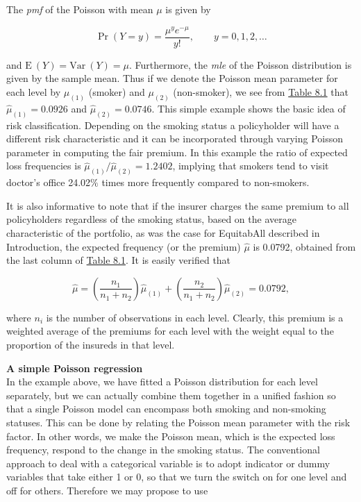 \documentclass[]{book}
\theoremstyle{definition}
\theoremstyle{definition}
\theoremstyle{definition}
\theoremstyle{remark}
\begin{document}
The \emph{pmf} of the Poisson with mean \(\mu\) is given by

\begin{equation}
\Pr(Y=y)=\frac{\mu^y e^{-\mu}}{y!},\qquad y=0,1,2, \ldots
\label{eq:Pois-pmf}
\end{equation}

and \(\mathrm{E~}{(Y)}=\mathrm{Var~}{(Y)}=\mu\). Furthermore, the
\emph{mle} of the Poisson distribution is given by the sample mean. Thus
if we denote the Poisson mean parameter for each level by \(\mu_{(1)}\)
(smoker) and \(\mu_{(2)}\) (non-smoker), we see from
\protect\hyperlink{tab:8.1}{Table 8.1} that \(\hat{\mu}_{(1)}=0.0926\)
and \(\hat{\mu}_{(2)}=0.0746\). This simple example shows the basic idea
of risk classification. Depending on the smoking status a policyholder
will have a different risk characteristic and it can be incorporated
through varying Poisson parameter in computing the fair premium. In this
example the ratio of expected loss frequencies is
\(\hat{\mu}_{(1)}/\hat{\mu}_{(2)}=1.2402\), implying that smokers tend
to visit doctor's office 24.02\(\%\) times more frequently compared to
non-smokers.

It is also informative to note that if the insurer charges the same
premium to all policyholders regardless of the smoking status, based on
the average characteristic of the portfolio, as was the case for
EquitabAll described in Introduction, the expected frequency (or the
premium) \(\hat{\mu}\) is 0.0792, obtained from the last column of
\protect\hyperlink{tab:8.1}{Table 8.1}. It is easily verified that

\begin{equation}
\hat{\mu} = \left(\frac{n_1}{n_1+n_2}\right)\hat{\mu}_{(1)}+\left(\frac{n_2}{n_1+n_2}\right)\hat{\mu}_{(2)}=0.0792,
\label{eq:coll-prem-avg}
\end{equation}

where \(n_i\) is the number of observations in each level. Clearly, this
premium is a weighted average of the premiums for each level with the
weight equal to the proportion of the insureds in that level.

\textbf{A simple Poisson regression}\\
In the example above, we have fitted a Poisson distribution for each
level separately, but we can actually combine them together in a unified
fashion so that a single Poisson model can encompass both smoking and
non-smoking statuses. This can be done by relating the Poisson mean
parameter with the risk factor. In other words, we make the Poisson
mean, which is the expected loss frequency, respond to the change in the
smoking status. The conventional approach to deal with a categorical
variable is to adopt indicator or dummy variables that take either 1 or
0, so that we turn the switch on for one level and off for others.
Therefore we may propose to use
\end{document}
